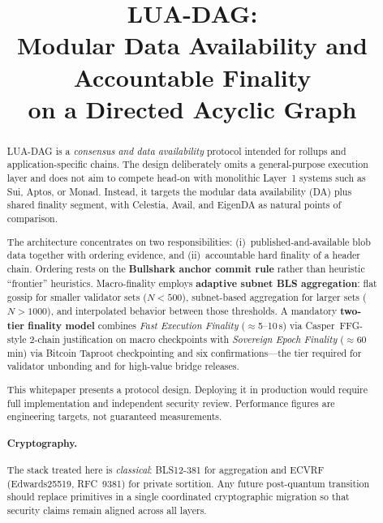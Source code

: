 \documentclass[11pt,a4paper,twoside]{report}
\title{LUA-DAG:\\Modular Data Availability and Accountable Finality\\on a Directed Acyclic Graph}
\author{}
\date{}
\theoremstyle{definition}
\begin{document}
\hypersetup{pageanchor=false}
\maketitle
\hypersetup{pageanchor=true}

\begin{abstract}
LUA-DAG is a \emph{consensus and data availability} protocol intended for rollups and application-specific chains. The design deliberately omits a general-purpose execution layer and does not aim to compete head-on with monolithic Layer~1 systems such as Sui, Aptos, or Monad. Instead, it targets the modular data availability (DA) plus shared finality segment, with Celestia, Avail, and EigenDA as natural points of comparison.

The architecture concentrates on two responsibilities: (i)~published-and-available blob data together with ordering evidence, and (ii)~accountable hard finality of a header chain. Ordering rests on the \textbf{Bullshark anchor commit rule} rather than heuristic ``frontier'' heuristics. Macro-finality employs \textbf{adaptive subnet BLS aggregation}: flat gossip for smaller validator sets ($N < 500$), subnet-based aggregation for larger sets ($N > 1000$), and interpolated behavior between those thresholds. A mandatory \textbf{two-tier finality model} combines \emph{Fast Execution Finality} ($\approx$5--10\,s) via Casper~FFG-style 2-chain justification on macro checkpoints with \emph{Sovereign Epoch Finality} ($\approx$60\,min) via Bitcoin Taproot checkpointing and six confirmations---the tier required for validator unbonding and for high-value bridge releases.

This whitepaper presents a protocol design. Deploying it in production would require full implementation and independent security review. Performance figures are engineering targets, not guaranteed measurements.

\paragraph{Cryptography.} The stack treated here is \emph{classical}: BLS12-381 for aggregation and ECVRF (Edwards25519, RFC~9381) for private sortition. Any future post-quantum transition should replace primitives in a single coordinated cryptographic migration so that security claims remain aligned across all layers.
\end{abstract}
\end{document}
